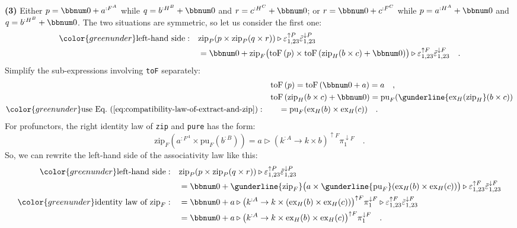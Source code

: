 \textbf{(3)} Either $p=\bbnum 0+a^{:F^{A}}$ while $q=b^{:H^{B}}+\bbnum 0$
and $r=c^{:H^{C}}+\bbnum 0$; or $r=\bbnum 0+c^{:F^{C}}$ while $p=a^{:H^{A}}+\bbnum 0$
and $q=b^{:H^{B}}+\bbnum 0$. The two situations are symmetric, so
let us consider the first one:
\begin{align*}
{\color{greenunder}\text{left-hand side}:}\quad & \text{zip}_{P}(p\times\text{zip}_{P}(q\times r))\triangleright\varepsilon_{1,23}^{\uparrow P}\tilde{\varepsilon}_{1,23}^{\downarrow P}\\
 & =\bbnum 0+\text{zip}_{F}\big(\text{toF}\,(p)\times\text{toF}\,(\text{zip}_{H}(b\times c)+\bbnum 0)\big)\triangleright\varepsilon_{1,23}^{\uparrow F}\tilde{\varepsilon}_{1,23}^{\downarrow F}\quad.
\end{align*}
Simplify the sub-expressions involving \lstinline!toF! separately:
\begin{align*}
 & \text{toF}\,(p)=\text{toF}\,(\bbnum 0+a)=a\quad,\\
 & \text{toF}\,(\text{zip}_{H}(b\times c)+\bbnum 0)=\text{pu}_{F}(\gunderline{\text{ex}_{H}(\text{zip}_{H}}(b\times c))\\
{\color{greenunder}\text{use Eq.~(\ref{eq:compatibility-law-of-extract-and-zip})}:}\quad & \quad=\text{pu}_{F}(\text{ex}_{H}(b)\times\text{ex}_{H}(c))\quad.
\end{align*}
For profunctors, the right identity law of \lstinline!zip! and \lstinline!pure!
has the form:
\[
\text{zip}_{F}(a^{:F^{A}}\times\text{pu}_{F}(b^{:B}))=a\triangleright(k^{:A}\rightarrow k\times b)^{\uparrow F}\pi_{1}^{\downarrow F}\quad.
\]
So, we can rewrite the left-hand side of the associativity law like
this:
\begin{align*}
{\color{greenunder}\text{left-hand side}:}\quad & \text{zip}_{P}(p\times\text{zip}_{P}(q\times r))\triangleright\varepsilon_{1,23}^{\uparrow P}\tilde{\varepsilon}_{1,23}^{\downarrow P}\\
 & =\bbnum 0+\gunderline{\text{zip}_{F}}\big(a\times\gunderline{\text{pu}_{F}}(\text{ex}_{H}(b)\times\text{ex}_{H}(c))\big)\triangleright\varepsilon_{1,23}^{\uparrow F}\tilde{\varepsilon}_{1,23}^{\downarrow F}\\
{\color{greenunder}\text{identity law of }\text{zip}_{F}:}\quad & =\bbnum 0+a\triangleright\big(k^{:A}\rightarrow k\times(\text{ex}_{H}(b)\times\text{ex}_{H}(c))\big)^{\uparrow F}\pi_{1}^{\downarrow F}\triangleright\varepsilon_{1,23}^{\uparrow F}\tilde{\varepsilon}_{1,23}^{\downarrow F}\\
 & =\bbnum 0+a\triangleright\big(k^{:A}\rightarrow k\times\text{ex}_{H}(b)\times\text{ex}_{H}(c)\big)^{\uparrow F}\pi_{1}^{\downarrow F}\quad.
\end{align*}
